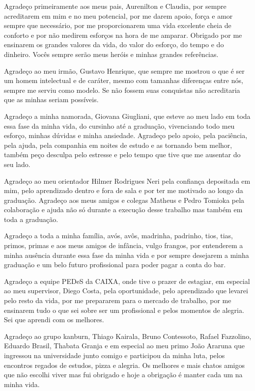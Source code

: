 \begin{agradecimentos}

Agradeço primeiramente aos meus pais, Aurenilton e Claudia, por sempre acreditarem em mim e no meu potencial, por me darem apoio, força e amor sempre que necessário, por me proporcionarem uma vida excelente cheia de conforto e por não medirem esforços na hora de me amparar. Obrigado por me ensinarem os grandes valores da vida, do valor do esforço, do tempo e do dinheiro. Vocês sempre serão meus heróis e minhas grandes referências.

Agradeço ao meu irmão, Gustavo Henrique, que sempre me mostrou o que é ser um homem intelectual e de caráter, mesmo com tamanhas diferenças entre nós, sempre me serviu como modelo. Se não fossem suas conquistas não acreditaria que as minhas seriam possíveis.

Agradeço a minha namorada, Giovana Giugliani, que esteve ao meu lado em toda essa fase da minha vida, do cursinho até a graduação, vivenciando todo meu esforço,  minhas dúvidas e minha ansiedade. Agradeço pelo apoio, pela paciência, pela ajuda, pela companhia em noites de estudo e as tornando bem melhor, também peço desculpa pelo estresse e pelo tempo que tive que me ausentar do seu lado. 

Agradeço ao meu orientador Hilmer Rodrigues Neri pela confiança depositada em mim, pelo aprendizado dentro e fora de sala e por ter me motivado ao longo da graduação. Agradeço aos meus amigos e colegas Matheus e Pedro Tomioka pela colaboração e ajuda não só durante a execução desse trabalho mas também em toda a graduação.

Agradeço a toda a minha família, avós, avôs, madrinha, padrinho, tios, tias, primos, primas e   aos meus amigos de infância, vulgo frangos, por entenderem a minha ausência durante essa fase da minha vida e por sempre desejarem a minha graduação e um belo futuro profissional para poder pagar a conta do bar.

Agradeço a equipe PEDeS da CAIXA, onde tive o prazer de estagiar, em especial ao meu supervisor, Diego Costa, pela oportunidade, pelo aprendizado que levarei pelo resto da vida, por me prepararem para o mercado de trabalho, por me ensinarem tudo o que sei sobre ser um profissional e pelos momentos de alegria. Sei que aprendi com os melhores.

Agradeço ao grupo kanburn, Thiago Kairala, Bruno Contessoto, Rafael Fazzolino, Eduardo Brasil, Thabata Granja e em especial ao meu primo João Araruna que ingressou na universidade junto comigo e participou da minha luta, pelos encontros regados de estudos, pizza e alegria. Os melhores e mais chatos amigos que não escolhi viver mas fui obrigado e hoje a obrigação é manter cada um na minha vida.

\end{agradecimentos}